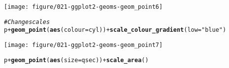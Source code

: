 \documentclass[a4paper,titlepage]{tufte-handout}\usepackage[]{graphicx}\usepackage[]{color}
\makeatletter
\def\maxwidth{ %
  \ifdim\Gin@nat@width>\linewidth
    \linewidth
  \else
    \Gin@nat@width
  \fi
}
\newcommand{\hlstr}[1]{\textcolor[rgb]{0.192,0.494,0.8}{#1}}%
\newcommand{\hlcom}[1]{\textcolor[rgb]{0.678,0.584,0.686}{\textit{#1}}}%
\newcommand{\hlopt}[1]{\textcolor[rgb]{0,0,0}{#1}}%
\newcommand{\hlstd}[1]{\textcolor[rgb]{0.345,0.345,0.345}{#1}}%
\newcommand{\hlkwc}[1]{\textcolor[rgb]{0.333,0.667,0.333}{#1}}%
\newcommand{\hlkwd}[1]{\textcolor[rgb]{0.737,0.353,0.396}{\textbf{#1}}}%
\newenvironment{kframe}{%
 \def\at@end@of@kframe{}%
 \ifinner\ifhmode%
  \def\at@end@of@kframe{\end{minipage}}%
  \begin{minipage}{\columnwidth}%
 \fi\fi%
 \def\FrameCommand##1{\hskip\@totalleftmargin \hskip-\fboxsep
 \colorbox{shadecolor}{##1}\hskip-\fboxsep
     \hskip-\linewidth \hskip-\@totalleftmargin \hskip\columnwidth}%
 \MakeFramed {\advance\hsize-\width
   \@totalleftmargin\z@ \linewidth\hsize
   \@setminipage}}%
 {\par\unskip\endMakeFramed%
 \at@end@of@kframe}
\newenvironment{knitrout}{}{} %
\makeatother
\begin{document}
\begin{knitrout}
\texttt{[image: figure/021-ggplot2-geoms-geom\_point6]} 
\begin{kframe}\begin{alltt}
\hlcom{# Change scales}
\hlstd{p} \hlopt{+} \hlkwd{geom_point}\hlstd{(}\hlkwd{aes}\hlstd{(}\hlkwc{colour} \hlstd{= cyl))} \hlopt{+} \hlkwd{scale_colour_gradient}\hlstd{(}\hlkwc{low} \hlstd{=} \hlstr{"blue"}\hlstd{)}
\end{alltt}
\end{kframe}
\texttt{[image: figure/021-ggplot2-geoms-geom\_point7]} 
\begin{kframe}\begin{alltt}
\hlstd{p} \hlopt{+} \hlkwd{geom_point}\hlstd{(}\hlkwd{aes}\hlstd{(}\hlkwc{size} \hlstd{= qsec))} \hlopt{+} \hlkwd{scale_area}\hlstd{()}
\end{alltt}



\end{kframe}
\end{knitrout}
\end{document}
